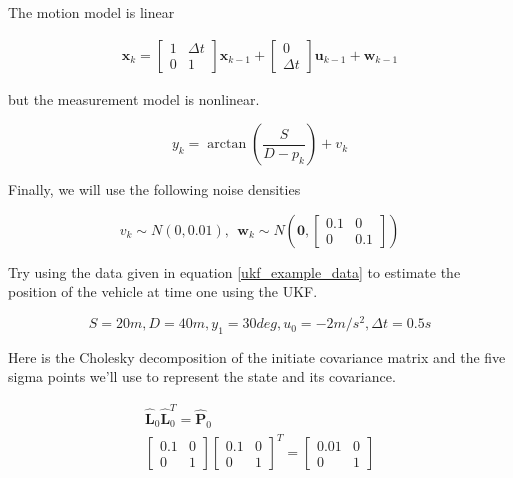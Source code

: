 The motion model is linear 

\begin{eqnarray}
\mathbf{x}_k = 
\begin{bmatrix}
1 & \Delta t \\
0 & 1
\end{bmatrix}
\mathbf{x}_{k-1} + 
\begin{bmatrix}
 0 \\
 \Delta t 
\end{bmatrix}
\mathbf{u}_{k-1} + \mathbf{w}_{k-1}
\end{eqnarray}

but the measurement model is nonlinear. 

\begin{equation}
y_k = \arctan(\frac{S}{D - p_k}) + v_k
\end{equation}

Finally, we will use the following noise densities

\begin{equation}
v_k \sim N(0, 0.01), ~~ \mathbf{w}_k \sim N(\mathbf{0}, \begin{bmatrix} 0.1 & 0 \\ 0 & 0.1 \end{bmatrix})
\end{equation}

Try using the data given in equation \ref{ukf_example_data} to estimate
the position of the vehicle at time one using the UKF. 

\begin{equation}
S = 20m, D= 40m, y_1 = 30 deg, u_0 = -2m/s^2, \Delta t = 0.5s
\label{ukf_example_data}
\end{equation}

Here is the Cholesky decomposition of
the initiate covariance matrix and the five sigma points we'll use to
represent the state and its covariance. 

\begin{eqnarray}
\hat{\mathbf{L}}_0\hat{\mathbf{L}}_{0}^T = \hat{\mathbf{P}}_0 \\
\begin{bmatrix}
0.1 & 0 \\
0 & 1
\end{bmatrix}
\begin{bmatrix}
0.1 & 0 \\
0 & 1
\end{bmatrix}^T = 
\begin{bmatrix}
0.01 & 0 \\
0 & 1
\end{bmatrix}
\label{ukf_example_data}
\end{eqnarray}



